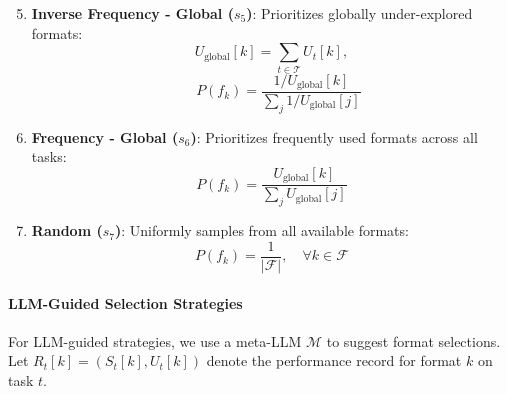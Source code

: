 \begin{enumerate}
    \setcounter{enumi}{4}
    \item \textbf{Inverse Frequency - Global ($s_5$)}: Prioritizes globally under-explored formats:
    \begin{equation}
    U_{\text{global}}[k] = \sum_{t \in \mathcal{T}} U_t[k],
    \end{equation}
    \begin{equation}
    \quad P(f_k) = \frac{1/U_{\text{global}}[k]}{\sum_{j} 1/U_{\text{global}}[j]}
    \end{equation}
    
    \item \textbf{Frequency - Global ($s_6$)}: Prioritizes frequently used formats across all tasks:
    \begin{equation}
    P(f_k) = \frac{U_{\text{global}}[k]}{\sum_{j} U_{\text{global}}[j]}
    \end{equation}
    
    \item \textbf{Random ($s_7$)}: Uniformly samples from all available formats:
    \begin{equation}
    P(f_k) = \frac{1}{|\mathcal{F}|}, \quad \forall k \in \mathcal{F}
    \end{equation}
\end{enumerate}

\paragraph{LLM-Guided Selection Strategies}

For LLM-guided strategies, we use a meta-LLM $\mathcal{M}$ to suggest format selections. Let $R_t[k] = (S_t[k], U_t[k])$ denote the performance record for format $k$ on task $t$.

